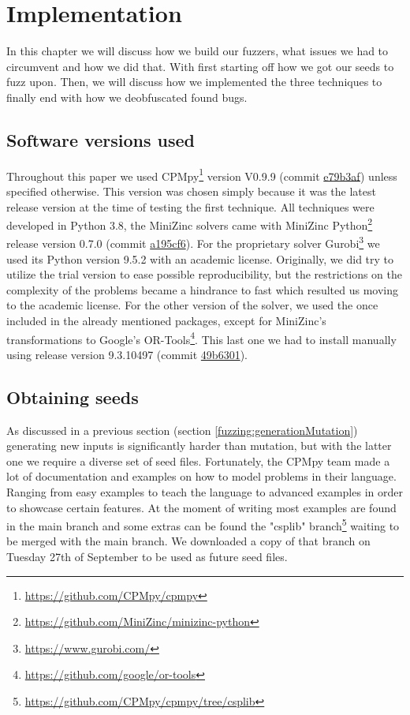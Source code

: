 \chapter{Implementation}
\label{cha:impl}
\label{impl:Intro}
In this chapter we will discuss how we build our fuzzers, what issues we had to circumvent and how we did that. With first starting off how we got our seeds to fuzz upon. Then, we will discuss how we implemented the three techniques to finally end with how we deobfuscated found bugs.

\section{Software versions used}
Throughout this paper we used CPMpy\footnote{\url{https://github.com/CPMpy/cpmpy}} version V0.9.9 (commit \href{https://github.com/CPMpy/cpmpy/commit/e79b3afedc934a9437c2ddb3a9f54d7e2d7bd3ee}{e79b3af}) unless specified otherwise. This version was chosen simply because it was the latest release version at the time of testing the first technique. All techniques were developed in Python 3.8, the MiniZinc solvers came with MiniZinc Python\footnote{\url{https://github.com/MiniZinc/minizinc-python}} release version 0.7.0 (commit \href{https://github.com/MiniZinc/minizinc-python/commit/a195cf63fcfbc98665d70ab64efb5424db25bd7e}{a195cf6}). For the proprietary solver Gurobi\footnote{\url{https://www.gurobi.com/}} we used its Python version 9.5.2 with an academic license. 
Originally, we did try to utilize the trial version to ease possible reproducibility, but the restrictions on the complexity of the problems became a hindrance to fast which resulted us moving to the academic license. For the other version of the solver, we used the once included in the already mentioned packages, except for MiniZinc's transformations to Google's OR-Tools\footnote{\url{https://github.com/google/or-tools}}. This last one we had to install manually using release version 9.3.10497 (commit \href{https://github.com/google/or-tools/commit/49b6301e1e1e231d654d79b6032e79809868a70e}{49b6301}).


\section{Obtaining seeds}
\label{impl:obtainingSeeds}
As discussed in a previous section (section \ref{fuzzing:generationMutation}) generating new inputs is significantly harder than mutation, but with the latter one we require a diverse set of seed files. Fortunately, the CPMpy team made a lot of documentation and examples on how to model problems in their language. Ranging from easy examples to teach the language to advanced examples in order to showcase certain features. 
At the moment of writing most examples are found in the main branch and some extras can be found the "csplib" branch\footnote{\url{https://github.com/CPMpy/cpmpy/tree/csplib}} waiting to be merged with the main branch. We downloaded a copy of that branch on Tuesday 27th of September to be used as future seed files. 

